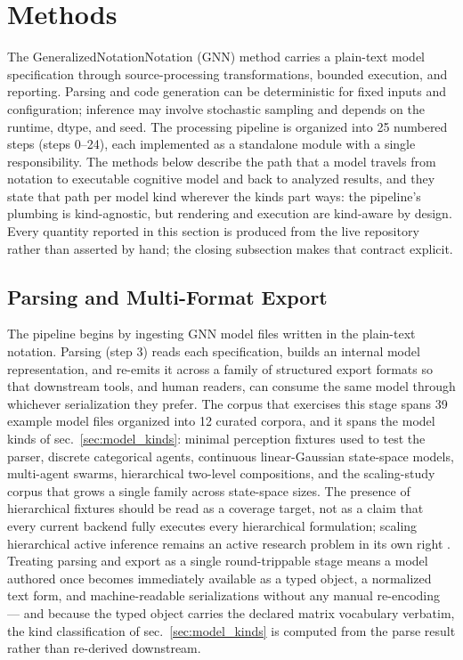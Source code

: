 \documentclass[
  english,
  9pt,
]{extarticle}
\begin{document}
\newpage

\section{Methods}\label{sec:methods}

The GeneralizedNotationNotation (GNN) method carries a plain-text model
specification through source-processing transformations, bounded
execution, and reporting. Parsing and code generation can be
deterministic for fixed inputs and configuration; inference may involve
stochastic sampling and depends on the runtime, dtype, and seed. The
processing pipeline is organized into 25 numbered steps (steps 0--24),
each implemented as a standalone module with a single responsibility.
The methods below describe the path that a model travels from notation
to executable cognitive model and back to analyzed results, and they
state that path per model kind wherever the kinds part ways: the
pipeline's plumbing is kind-agnostic, but rendering and execution are
kind-aware by design. Every quantity reported in this section is
produced from the live repository rather than asserted by hand; the
closing subsection makes that contract explicit.

\subsection{Parsing and Multi-Format
Export}\label{parsing-and-multi-format-export}

The pipeline begins by ingesting GNN model files written in the
plain-text notation. Parsing (step 3) reads each specification, builds
an internal model representation, and re-emits it across a family of
structured export formats so that downstream tools, and human readers,
can consume the same model through whichever serialization they prefer.
The corpus that exercises this stage spans 39 example model files
organized into 12 curated corpora, and it spans the model kinds of
sec.~\ref{sec:model_kinds}: minimal perception fixtures used to test the
parser, discrete categorical agents, continuous linear-Gaussian
state-space models, multi-agent swarms, hierarchical two-level
compositions, and the scaling-study corpus that grows a single family
across state-space sizes. The presence of hierarchical fixtures should
be read as a coverage target, not as a claim that every current backend
fully executes every hierarchical formulation; scaling hierarchical
active inference remains an active research problem in its own right
\citep{rangarajan2026hierarchicalSuccessor}. Treating parsing and export
as a single round-trippable stage means a model authored once becomes
immediately available as a typed object, a normalized text form, and
machine-readable serializations without any manual re-encoding --- and
because the typed object carries the declared matrix vocabulary
verbatim, the kind classification of sec.~\ref{sec:model_kinds} is
computed from the parse result rather than re-derived downstream.
\end{document}
